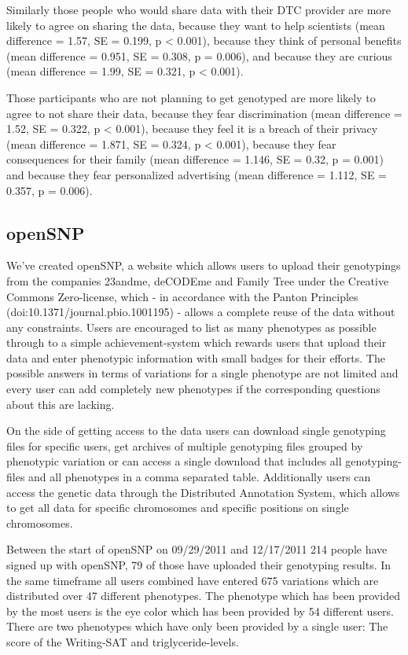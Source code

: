 \documentclass[10pt]{article}
\begin{document}
Similarly those people who would share data with their DTC provider are more likely to agree on sharing the data, because they want to help scientists (mean difference = 1.57, SE = 0.199, p < 0.001), because they think of personal benefits (mean difference = 0.951, SE = 0.308, p = 0.006), and because they are curious (mean difference = 1.99, SE = 0.321, p < 0.001). 

Those participants who are not planning to get genotyped are more likely to agree to not share their data, because they fear discrimination (mean difference = 1.52, SE = 0.322, p < 0.001), because they feel it is a breach of their privacy (mean difference = 1.871, SE = 0.324, p < 0.001), because they fear consequences for their family (mean difference = 1.146, SE = 0.32, p = 0.001) and because they fear personalized advertising (mean difference =  1.112, SE = 0.357, p = 0.006). 

\subsection*{openSNP}
We've created openSNP, a website which allows users to upload their genotypings from the companies 23andme, deCODEme and Family Tree under the Creative Commons Zero-license, which - in accordance with the Panton Principles (doi:10.1371/journal.pbio.1001195) - allows a complete reuse of the data without any constraints. Users are encouraged to list as many phenotypes as possible through to a simple achievement-system which rewards users that upload their data and enter phenotypic information with small badges for their efforts. The possible answers in terms of variations for a single phenotype are not limited and every user can add completely new phenotypes if the corresponding questions about this are lacking.   

On the side of getting access to the data users can download single genotyping files for specific users, get archives of multiple genotyping files grouped by phenotypic variation or can access a single download that includes all genotyping-files and all phenotypes in a comma separated table. Additionally users can access the genetic data through the Distributed Annotation System, which allows to get all data for specific chromosomes and specific positions on single chromosomes.

Between the start of openSNP on 09/29/2011 and 12/17/2011 214 people have signed up with openSNP, 79 of those have uploaded their genotyping results. In the same timeframe all users combined have entered 675 variations which are distributed over 47 different phenotypes. The phenotype which has been provided by the most users is the eye color which has been provided by 54 different users. There are two phenotypes which have only been provided by a single user: The score of the Writing-SAT and triglyceride-levels. 
\end{document}
